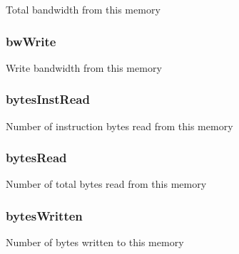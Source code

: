 \label{classAbstractMemory_a678ff8c93c78d0be1884742ef8aa41e8}
Total bandwidth from this memory \hypertarget{classAbstractMemory_a8077d31db9c4f4f9e78888def6de8430}{
\subsubsection[{bwWrite}]{ {\bf bwWrite}}}
\label{classAbstractMemory_a8077d31db9c4f4f9e78888def6de8430}
Write bandwidth from this memory \hypertarget{classAbstractMemory_a5e52eb4a824c1fb452d77dae86dfa970}{
\subsubsection[{bytesInstRead}]{ {\bf bytesInstRead}}}
\label{classAbstractMemory_a5e52eb4a824c1fb452d77dae86dfa970}
Number of instruction bytes read from this memory \hypertarget{classAbstractMemory_aa36971a2ea8ddd9d82832059cbc1b21f}{
\subsubsection[{bytesRead}]{ {\bf bytesRead}}}
\label{classAbstractMemory_aa36971a2ea8ddd9d82832059cbc1b21f}
Number of total bytes read from this memory \hypertarget{classAbstractMemory_ab89ec4a4876671ad5186d0e9c0e674ed}{
\subsubsection[{bytesWritten}]{ {\bf bytesWritten}}}
\label{classAbstractMemory_ab89ec4a4876671ad5186d0e9c0e674ed}
Number of bytes written to this memory 

